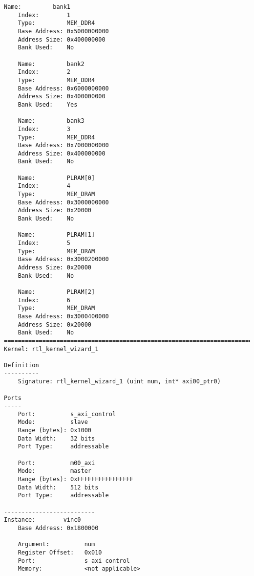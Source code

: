 \begin{center}
\begin{lstlisting}[label=lst:xclbin_info,caption=Файл vinc.xclbin.info]
    Name:         bank1
    Index:        1
    Type:         MEM_DDR4
    Base Address: 0x5000000000
    Address Size: 0x400000000
    Bank Used:    No

    Name:         bank2
    Index:        2
    Type:         MEM_DDR4
    Base Address: 0x6000000000
    Address Size: 0x400000000
    Bank Used:    Yes

    Name:         bank3
    Index:        3
    Type:         MEM_DDR4
    Base Address: 0x7000000000
    Address Size: 0x400000000
    Bank Used:    No

    Name:         PLRAM[0]
    Index:        4
    Type:         MEM_DRAM
    Base Address: 0x3000000000
    Address Size: 0x20000
    Bank Used:    No

    Name:         PLRAM[1]
    Index:        5
    Type:         MEM_DRAM
    Base Address: 0x3000200000
    Address Size: 0x20000
    Bank Used:    No

    Name:         PLRAM[2]
    Index:        6
    Type:         MEM_DRAM
    Base Address: 0x3000400000
    Address Size: 0x20000
    Bank Used:    No
==============================================================================
Kernel: rtl_kernel_wizard_1

Definition
----------
    Signature: rtl_kernel_wizard_1 (uint num, int* axi00_ptr0)

Ports
-----
    Port:          s_axi_control
    Mode:          slave
    Range (bytes): 0x1000
    Data Width:    32 bits
    Port Type:     addressable

    Port:          m00_axi
    Mode:          master
    Range (bytes): 0xFFFFFFFFFFFFFFFF
    Data Width:    512 bits
    Port Type:     addressable

--------------------------
Instance:        vinc0
    Base Address: 0x1800000

    Argument:          num
    Register Offset:   0x010
    Port:              s_axi_control
    Memory:            <not applicable>


\end{lstlisting}
\end{center}
